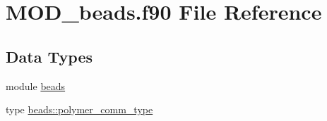 \hypertarget{MOD__beads_8f90}{\section{M\-O\-D\-\_\-beads.\-f90 File Reference}
\label{MOD__beads_8f90}
}
\subsection*{Data Types}
\begin{DoxyCompactItemize}
\item 
module \hyperlink{classbeads}{beads}
\item 
type \hyperlink{structbeads_1_1polymer__comm__type}{beads\-::polymer\-\_\-comm\-\_\-type}
\end{DoxyCompactItemize}
